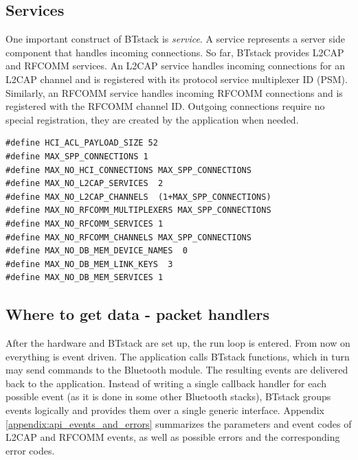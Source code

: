 \documentclass[a4paper,titlepage,oneside,12pt]{amsart} %
\begin{document}
\subsection{Services}
One important construct of BTstack is \emph{service}. A service represents a server side component that handles incoming connections. So far, BTstack provides L2CAP and RFCOMM services. An L2CAP service handles incoming connections for an L2CAP channel and is registered with its protocol service multiplexer ID (PSM). Similarly,  an RFCOMM service handles incoming RFCOMM connections and is registered with the RFCOMM channel ID. Outgoing connections require no special registration, they are created by the application when needed. 

\noindent\begin{minipage}{\textwidth}
\begin{lstlisting}[caption=Memory configuration for an SPP service with a minimal L2CAP MTU., label=memoryConfigurationSPP]
#define HCI_ACL_PAYLOAD_SIZE 52
#define MAX_SPP_CONNECTIONS 1
#define MAX_NO_HCI_CONNECTIONS MAX_SPP_CONNECTIONS
#define MAX_NO_L2CAP_SERVICES  2
#define MAX_NO_L2CAP_CHANNELS  (1+MAX_SPP_CONNECTIONS)
#define MAX_NO_RFCOMM_MULTIPLEXERS MAX_SPP_CONNECTIONS
#define MAX_NO_RFCOMM_SERVICES 1
#define MAX_NO_RFCOMM_CHANNELS MAX_SPP_CONNECTIONS
#define MAX_NO_DB_MEM_DEVICE_NAMES  0
#define MAX_NO_DB_MEM_LINK_KEYS  3
#define MAX_NO_DB_MEM_SERVICES 1
\end{lstlisting}
\end{minipage}

\subsection{Where to get data - packet handlers}
\label{section:packetHandlers}

After the hardware and BTstack are set up, the run loop is entered. From now on everything is event driven. The application calls BTstack functions, which in turn may send commands to the Bluetooth module. The resulting events are delivered back to the application. Instead of writing a single callback handler for each possible event (as it is done in some other Bluetooth stacks), BTstack groups events logically and provides them over a single generic interface.  Appendix \ref{appendix:api_events_and_errors} summarizes the parameters and event codes of L2CAP and RFCOMM events, as well as possible errors and the corresponding error codes.
\end{document}
